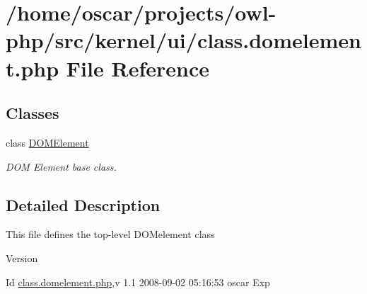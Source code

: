 \section{/home/oscar/projects/owl-\/php/src/kernel/ui/class.domelement.php File Reference}
\label{class_8domelement_8php}
\subsection*{Classes}
\begin{DoxyCompactItemize}
\item 
class \hyperlink{classDOMElement}{DOMElement}
\begin{DoxyCompactList}\small\item\em DOM Element base class. \item\end{DoxyCompactList}\end{DoxyCompactItemize}


\subsection{Detailed Description}
This file defines the top-\/level DOMelement class \begin{DoxyVersion}{Version}

\end{DoxyVersion}
\begin{DoxyParagraph}{Id}
\hyperlink{class_8domelement_8php}{class.domelement.php},v 1.1 2008-\/09-\/02 05:16:53 oscar Exp 
\end{DoxyParagraph}
